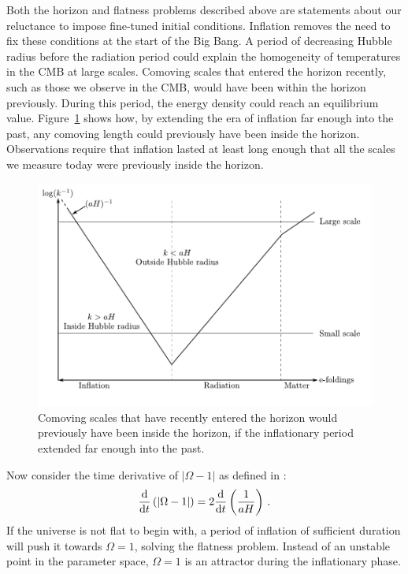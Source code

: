 Both the horizon and flatness problems described above are statements about our
reluctance to impose fine-tuned initial conditions. Inflation removes the need
to fix these conditions at the start of the Big Bang.
A period of decreasing Hubble radius before the radiation period could explain the
homogeneity of temperatures in the CMB at large scales.
Comoving scales that entered the horizon recently, such as
those we observe in the CMB, would have been within the horizon previously. 
During this period, the energy density could reach an equilibrium
value.
Figure~\ref{fig:comovingscales-intro} shows how, by extending
the era of inflation far enough into the past, any comoving length could
previously have been inside the horizon.
Observations require that inflation lasted at least long enough that all the
scales we measure today were previously inside the horizon. 
% 
\begin{figure}[htbp]
\centering
 \includegraphics[width=\textwidth]{graphs/scales.pdf}
 \caption[Comoving Scales and the Hubble Radius]{Comoving scales that have recently
entered the horizon would
previously have been inside the horizon, if the inflationary period extended far
enough into the past.}
 \label{fig:comovingscales-intro}
\end{figure}
% 

Now consider the time derivative of $|\Omega -1|$ as defined in
:
% 
\begin{equation}
 \label{eq:omegaderiv-intro}
 \frac{\mathrm{d}}{\mathrm{d} t}\left(|\Omega -1 |\right) = 2\frac{\mathrm{d}}{\mathrm{d} t}
\left(\frac{1}{aH}\right)\,.
\end{equation}
% 
If the universe is not flat to begin with, a period of inflation of sufficient
duration will push it
towards $\Omega=1$, solving the flatness problem. Instead of an unstable point
in the parameter space, $\Omega=1$ is an attractor during the inflationary
phase. 
% 

